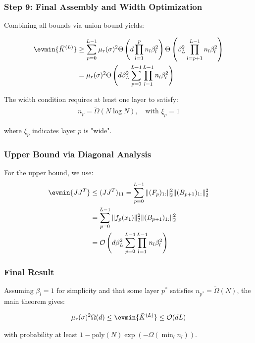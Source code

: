 \documentclass[a4paper]{article}
\theoremstyle{plain}
\theoremstyle{definition}
\theoremstyle{remark}
\begin{document}
\subsubsection{Step 9: Final Assembly and Width Optimization}

Combining all bounds via union bound yields:

\begin{align}
\evmin{\bar{K}^{(L)}} &\geq \sum_{p=0}^{L-1} \mu_r(\sigma)^2 \Theta\left(d \prod_{l=1}^p n_l \beta_l^2\right) \Theta\left(\beta_L^2 \prod_{l=p+1}^{L-1} n_l \beta_l^2\right) \\
&= \mu_r(\sigma)^2 \Theta\left(d \beta_L^2 \sum_{p=0}^{L-1} \prod_{l=1}^{L-1} n_l \beta_l^2\right)
\end{align}

The width condition requires at least one layer to satisfy:
\begin{align}
n_p = \tilde{\Omega}(N \log N), \quad \text{with } \xi_p = 1
\end{align}

where $\xi_p$ indicates layer $p$ is "wide".

\subsubsection{Upper Bound via Diagonal Analysis}

For the upper bound, we use:
\begin{align}
\evmin{JJ^T} &\leq (JJ^T)_{11} = \sum_{p=0}^{L-1} \|(F_p)_{1:}\|_2^2 \|(B_{p+1})_{1:}\|_2^2 \\
&= \sum_{p=0}^{L-1} \|f_p(x_1)\|_2^2 \|(B_{p+1})_{1:}\|_2^2 \\
&= \mathcal{O}\left(d \beta_L^2 \sum_{p=0}^{L-1} \prod_{l=1}^{L-1} n_l \beta_l^2\right)
\end{align}

\subsubsection{Final Result}

Assuming $\beta_l = 1$ for simplicity and that some layer $p^*$ satisfies $n_{p^*} = \tilde{\Omega}(N)$, the main theorem gives:

\begin{align}
\mu_r(\sigma)^2 \Omega(d) \leq \evmin{\bar{K}^{(L)}} \leq \mathcal{O}(d L)
\end{align}

with probability at least $1 - \text{poly}(N) \exp(-\Omega(\min_l n_l))$.
\end{document}
